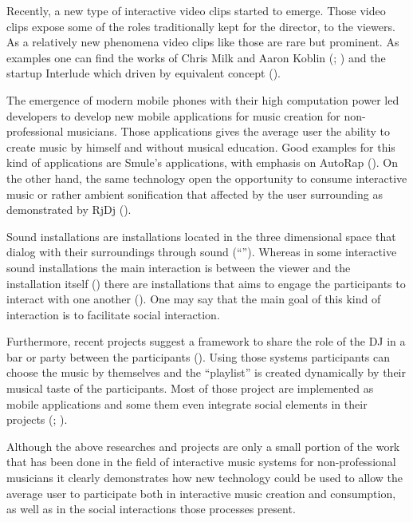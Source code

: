 Recently, a new type of interactive video clips started to emerge.
Those video clips expose some of the roles traditionally kept for the director, to the viewers.
As a relatively new phenomena video clips like those are rare but prominent.
As examples one can find the works of Chris Milk and Aaron Koblin (\cite{web:milk1}; \cite{web:milk2}) and the startup Interlude which driven by equivalent concept (\cite{web:interlude}).

The emergence of modern mobile phones with their high computation power led developers to develop new mobile applications for music creation for non-professional musicians.
Those applications gives the average user the ability to create music by himself and without musical education.
Good examples for this kind of applications are Smule's applications, with emphasis on AutoRap (\cite{web:autorap}).
On the other hand, the same technology open the opportunity to consume interactive music or rather ambient sonification that affected by the user surrounding as demonstrated by RjDj (\cite{web:rjdj}).

Sound installations are installations located in the three dimensional space that dialog with their surroundings through sound (``'').
Whereas in some interactive sound installations the main interaction is between the viewer and the installation itself (\cite{web:visnjic}) there are installations that aims to engage the participants to interact with one another (\cite{eng03}).
One may say that the main goal of this kind of interaction is to facilitate social interaction.

Furthermore, recent projects suggest a framework to share the role of the DJ in a bar or party between the participants (\cite{web:shaw}).
Using those systems participants can choose the music by themselves and the ``playlist'' is created dynamically by their musical taste of the participants.
Most of those project are implemented as mobile applications and some them even integrate social elements in their projects (\cite{web:playmysong}; \cite{web:lammers}).

Although the above researches and projects are only a small portion of the work that has been done in the field of interactive music systems for non-professional musicians it clearly demonstrates how new technology could be used to allow the average user to participate both in interactive music creation and consumption, as well as in the social interactions those processes present.

